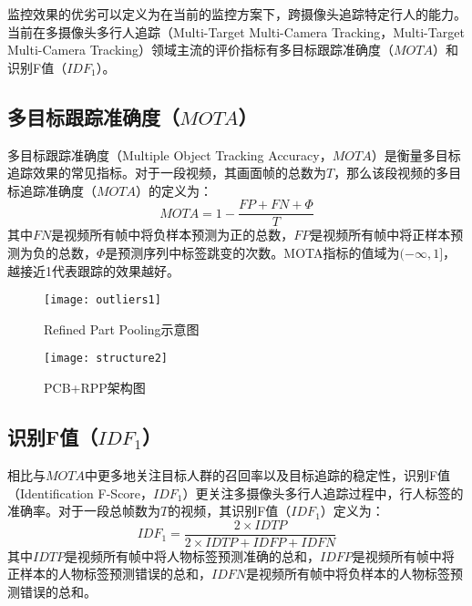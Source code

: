 监控效果的优劣可以定义为在当前的监控方案下，跨摄像头追踪特定行人的能力。当前在多摄像头多行人追踪（Multi-Target Multi-Camera Tracking，Multi-Target Multi-Camera Tracking）领域主流的评价指标有多目标跟踪准确度（$\mathit{MOTA}$）和识别F值（$\mathit{IDF_1}$）。

\subsection{多目标跟踪准确度（$\mathit{MOTA}$）}
多目标跟踪准确度（Multiple Object Tracking Accuracy，$\mathit{MOTA}$）是衡量多目标追踪效果的常见指标。对于一段视频，其画面帧的总数为$T$，那么该段视频的多目标追踪准确度（$\mathit{MOTA}$）的定义为：
\begin{equation}
\mathit{MOTA}=1-\frac{\mathit{FP}+\mathit{FN}+\Phi}{T}
\end{equation}
其中$\mathit{FN}$是视频所有帧中将负样本预测为正的总数，$\mathit{FP}$是视频所有帧中将正样本预测为负的总数，$\Phi$是预测序列中标签跳变的次数。MOTA指标的值域为$(-\infty,1]$，越接近1代表跟踪的效果越好。

\begin{figure}
\centering
\texttt{[image: outliers1]}
\caption{Refined Part Pooling示意图}
\label{fig:refined}
\end{figure}

\begin{figure}
\centering
\texttt{[image: structure2]}
\caption{PCB+RPP架构图}
\label{fig:structure2}
\end{figure}

\subsection{识别F值（$\mathit{IDF_1}$）}
相比与$\mathit{MOTA}$中更多地关注目标人群的召回率以及目标追踪的稳定性，识别F值（Identification F-Score，$\mathit{IDF_1}$）更关注多摄像头多行人追踪过程中，行人标签的准确率。对于一段总帧数为$T$的视频，其识别F值（$\mathit{IDF_1}$）定义为：
\begin{equation}
\mathit{IDF_1}=\frac{2\times\mathit{IDTP}}{2\times\mathit{IDTP}+\mathit{IDFP}+\mathit{IDFN}}
\end{equation}
其中$\mathit{IDTP}$是视频所有帧中将人物标签预测准确的总和，$\mathit{IDFP}$是视频所有帧中将正样本的人物标签预测错误的总和，$\mathit{IDFN}$是视频所有帧中将负样本的人物标签预测错误的总和。

